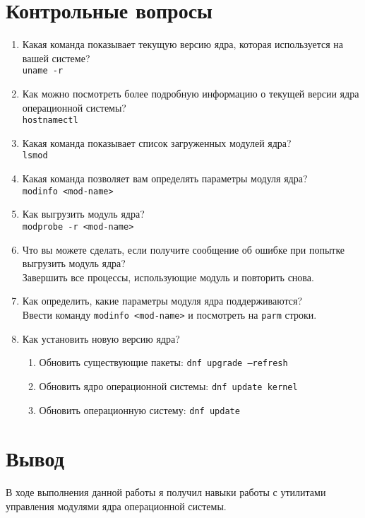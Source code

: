 \documentclass[12pt]{article}
\begin{document}
\section{Контрольные вопросы}
\begin{enumerate}
	\item Какая команда показывает текущую версию ядра, которая используется на вашей системе? \\
	      \texttt{uname -r}
	\item Как можно посмотреть более подробную информацию о текущей версии ядра операционной системы? \\
	      \texttt{hostnamectl}
	\item Какая команда показывает список загруженных модулей ядра? \\
	      \texttt{lsmod}
	\item Какая команда позволяет вам определять параметры модуля ядра? \\
	      \texttt{modinfo <mod-name>}
	\item Как выгрузить модуль ядра? \\
	      \texttt{modprobe -r <mod-name>}
	\item Что вы можете сделать, если получите сообщение об ошибке при попытке выгрузить модуль ядра? \\
	      Завершить все процессы, использующие модуль и повторить снова.
	\item Как определить, какие параметры модуля ядра поддерживаются? \\
	      Ввести команду \texttt{modinfo <mod-name>} и посмотреть на \texttt{parm} строки.
	\item Как установить новую версию ядра? \\
	      \begin{enumerate}
		      \item Обновить существующие пакеты: \texttt{dnf upgrade --refresh}
		      \item Обновить ядро операционной системы: \texttt{dnf update kernel}
		      \item Обновить операционную систему: \texttt{dnf update}
	      \end{enumerate}
\end{enumerate}

\section{Вывод}
В ходе выполнения данной работы я получил навыки работы с утилитами управления модулями ядра операционной системы.
\end{document}
